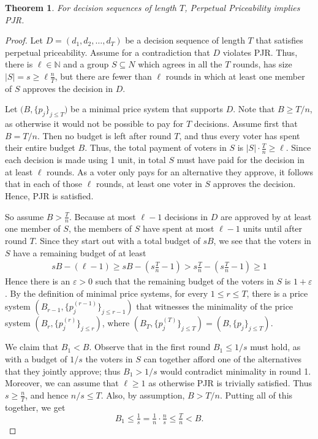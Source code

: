 \documentclass[10pt]{scrartcl}
\theoremstyle{plain}
\newtheorem{theorem}{Theorem}[section]
\theoremstyle{definition}
\renewcommand*{\le}{\leqslant}
\renewcommand*{\leq}{\leqslant}
\renewcommand*{\ge}{\geqslant}
\renewcommand*{\geq}{\geqslant}
\renewcommand{\epsilon}{\varepsilon}
\begin{document}
\begin{theorem}
    \label{thm:priceability_implies_PJR}
    For decision sequences of length $T$, Perpetual Priceability implies PJR.
\end{theorem}
\begin{proof}
Let $D = (d_1, d_2, \ldots, d_T)$ be a decision sequence of length $T$ that satisfies perpetual priceability. Assume for a contradiction that $D$ violates PJR. Thus, there is $\ell \in \mathbb N$ and a group $S \subseteq N$ which agrees in all the $T$ rounds, has size $|S| = s \ge \ell \frac{n}{T}$, but there are fewer than $\ell$ rounds in which at least one member of $S$ approves the decision in $D$. 

Let $\big(B,\{p_j\}_{j \leq T}\big)$ be a minimal price system that supports $D$. Note that $B \geq T / n$, as otherwise it would not be possible to pay for $T$ decisions. 
Assume first that $B = T / n$. Then no budget is left after round $T$, and thus every voter has spent their entire budget $B$. Thus, the total payment of voters in $S$ is $|S| \cdot \frac{T}{n} \ge \ell$. 
Since each decision is made using 1 unit, in total $S$ must have paid for the decision in at least $\ell$ rounds. As a voter only pays for an alternative they approve, it follows that in each of those $\ell$ rounds, at least one voter in $S$ approves the decision. Hence, PJR is satisfied. 

So assume $B > \frac{T}{n}$. Because at most $\ell - 1$  decisions in $D$ are approved by at least one member of $S$, the members of $S$ have spent at most $\ell - 1$ units until after round $T$. Since they start out with a total budget of $sB$, we see that the voters in $S$ have a remaining budget of at least
\begin{align}
sB - (\ell - 1)
\ge
sB - (s \tfrac Tn - 1)
> s \tfrac Tn - (s \tfrac Tn - 1)
\ge 1
\label{eq:priceability_remaining_budget}
\end{align}
Hence there is an $\epsilon > 0$ such that the remaining budget of the voters in $S$ is $1+\epsilon$. By the definition of minimal price systems, for every $1 \le r \le T$, there is a price system $ (B_{r-1}, \{p_j^{(r-1)} \}_{j \leq r-1} )$ that witnesses the minimality of the price system $ (B_r, \{p_j^{(r)} \}_{j \leq r} )$, where $ (B_T, \{p_j^{(T)} \}_{j \le T} )= (B, \{p_j \}_{j \le T} )$.

We claim that $B_1<B$. Observe that in the first round $B_1 \le 1 / s$ must hold, as with a budget of $1 / s$ the voters in $S$ can together afford one of the alternatives that they jointly approve; thus $B_1 > 1/s$ would contradict minimality in round 1. Moreover, we can assume that $\ell \geq 1$ as otherwise PJR is trivially satisfied. Thus $s \ge \frac n T$, and hence $n / s \le T$. Also, by assumption, $B>T / n$. Putting all of this together, we get
\[
B_1 \le \tfrac{1}{ s}=\tfrac1n \cdot \tfrac{n}{s} \le \tfrac{T}{n}<B .
\]


\end{proof}
\end{document}
